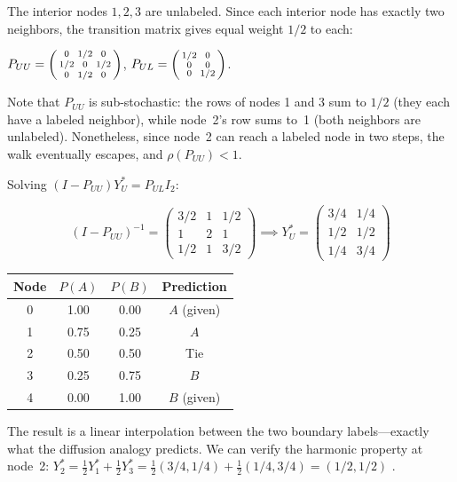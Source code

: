 \begin{notechapter}
\begin{example}
The interior nodes $1, 2, 3$ are unlabeled. Since each interior node has
exactly two neighbors, the transition matrix gives equal weight $1/2$ to each:

$P_{UU} = \begin{psmallmatrix} 0 & 1/2 & 0 \\ 1/2 & 0 & 1/2 \\
0 & 1/2 & 0 \end{psmallmatrix}$, \;
$P_{UL} = \begin{psmallmatrix} 1/2 & 0 \\ 0 & 0 \\ 0 & 1/2 \end{psmallmatrix}$.

\noindent Note that $P_{UU}$ is sub-stochastic: the rows of nodes 1 and 3 sum
to $1/2$ (they each have a labeled neighbor), while node~2's row sums to~1
(both neighbors are unlabeled). Nonetheless, since node~2 can reach a labeled
node in two steps, the walk eventually escapes, and $\rho(P_{UU}) < 1$.

Solving $(I - P_{UU})Y_U^* = P_{UL}I_2$:

\[
(I - P_{UU})^{-1} = \begin{pmatrix}
3/2 & 1 & 1/2 \\ 1 & 2 & 1 \\ 1/2 & 1 & 3/2
\end{pmatrix} \implies
Y_U^* = \begin{pmatrix} 3/4 & 1/4 \\ 1/2 & 1/2 \\ 1/4 & 3/4 \end{pmatrix}
\]

\begin{center}
\begin{tabular}{c|cc|c}
\toprule Node & $P(A)$ & $P(B)$ & Prediction \\ \midrule
0 & 1.00 & 0.00 & $A$ (given) \\
1 & 0.75 & 0.25 & $A$ \\
2 & 0.50 & 0.50 & Tie \\
3 & 0.25 & 0.75 & $B$ \\
4 & 0.00 & 1.00 & $B$ (given) \\ \bottomrule
\end{tabular}
\end{center}

The result is a linear interpolation between the two boundary labels---exactly
what the diffusion analogy predicts. We can verify the harmonic property at
node~2: $Y_2^* = \frac{1}{2}Y_1^* + \frac{1}{2}Y_3^*
= \frac{1}{2}(3/4,1/4) + \frac{1}{2}(1/4,3/4) = (1/2,1/2)$ \checkmark.


\end{example}
\end{notechapter}
